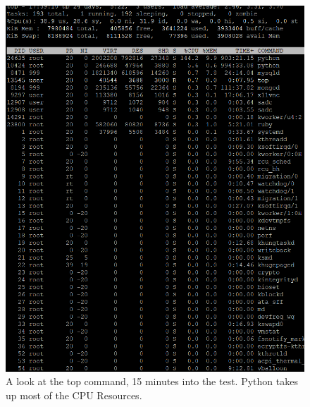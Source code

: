 \documentclass[12pt]{report}
\begin{document}
\newpage
\begin{figure}[h!]
	\centering
	\includegraphics[width=\textwidth,height=\textheight,keepaspectratio]{intro/S1_harshit.png}
	\caption{A look at the top command, 15 minutes into the test. Python takes up most of the CPU Resources.}
\end{figure}
\end{document}
